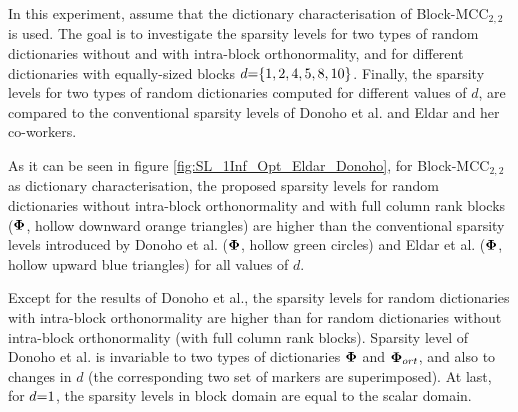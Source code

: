 In this experiment, assume that the dictionary characterisation of Block-MCC$_{2,2}$ is used.
The goal is to investigate the sparsity levels for two types of random dictionaries without and with intra-block orthonormality, and for different dictionaries with equally-sized blocks $d {=} \{ 1,2,4,5,8,10 \}$.
Finally, the sparsity levels for two types of random dictionaries computed for different values of $d$, are compared to the conventional sparsity levels of Donoho et al. and Eldar and her co-workers.

As it can be seen in figure \ref{fig:SL_1Inf_Opt_Eldar_Donoho}, for Block-MCC$_{2,2}$ as dictionary characterisation, the proposed sparsity levels for random dictionaries without intra-block orthonormality and with full column rank blocks ($\boldsymbol{\Phi}$, hollow downward orange triangles) are higher than the conventional sparsity levels introduced by Donoho et al. ($\boldsymbol{\Phi}$, hollow green circles) and Eldar et al. ($\boldsymbol{\Phi}$, hollow upward blue triangles) for all values of $d$.

Except for the results of Donoho et al., the sparsity levels for random dictionaries with intra-block orthonormality are higher than for random dictionaries without intra-block orthonormality (with full column rank blocks).
Sparsity level of Donoho et al. is invariable to two types of dictionaries $\boldsymbol{\Phi}$ and $\boldsymbol{\Phi}_{ort}$, and also to changes in $d$ (the corresponding two set of markers are superimposed).
At last, for $d {=} 1$, the sparsity levels in block domain are equal to the scalar domain.

\FloatBarrier